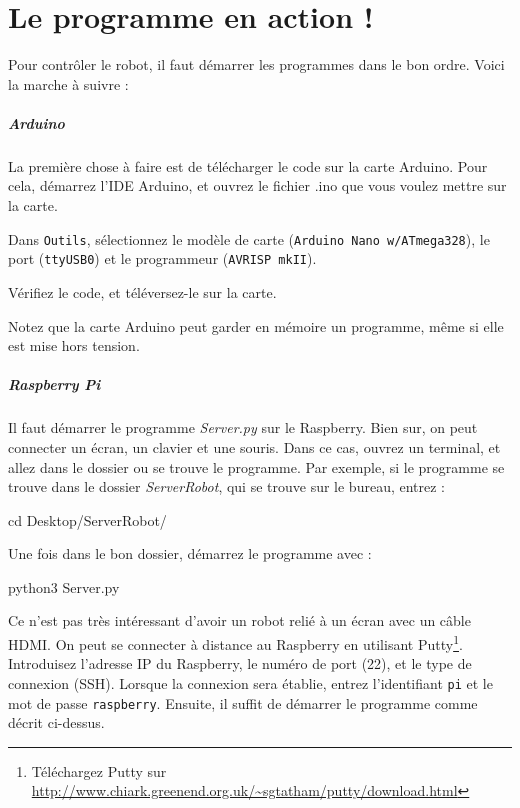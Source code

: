 \documentclass[12pt,a4paper]{report}
\begin{document}
\chapter{Le programme en action !}

Pour contrôler le robot, il faut démarrer les programmes dans le bon ordre. Voici la marche à suivre :

\paragraph{Arduino} La première chose à faire est de télécharger le code sur la carte Arduino. Pour cela, démarrez l'IDE Arduino, et ouvrez le fichier .ino que vous voulez mettre sur la carte.

Dans \verb=Outils=, sélectionnez le modèle de carte (\verb=Arduino Nano w/ATmega328=), le port (\verb=ttyUSB0=) et le programmeur (\verb=AVRISP mkII=).

Vérifiez le code, et téléversez-le sur la carte.

Notez que la carte Arduino peut garder en mémoire un programme, même si elle est mise hors tension.

\paragraph{Raspberry Pi} Il faut démarrer le programme \textit{Server.py} sur le Raspberry. Bien sur, on peut connecter un écran, un clavier et une souris. Dans ce cas, ouvrez un terminal, et allez dans le dossier ou se trouve le programme. Par exemple, si le programme se trouve dans le dossier \textit{ServerRobot}, qui se trouve sur le bureau, entrez :

\begin{verbatimtab}[3]
cd Desktop/ServerRobot/
\end{verbatimtab}

Une fois dans le bon dossier, démarrez le programme avec :

\begin{verbatimtab}[3]
python3 Server.py
\end{verbatimtab}

Ce n'est pas très intéressant d'avoir un robot relié à un écran avec un câble HDMI. On peut se connecter à distance au Raspberry en utilisant Putty\footnote{Téléchargez Putty sur \url{http://www.chiark.greenend.org.uk/~sgtatham/putty/download.html}}. Introduisez l'adresse IP du Raspberry, le numéro de port (22), et le type de connexion (SSH). Lorsque la connexion sera établie, entrez l'identifiant \verb=pi= et le mot de passe \verb=raspberry=. Ensuite, il suffit de démarrer le programme comme décrit ci-dessus.
\end{document}
